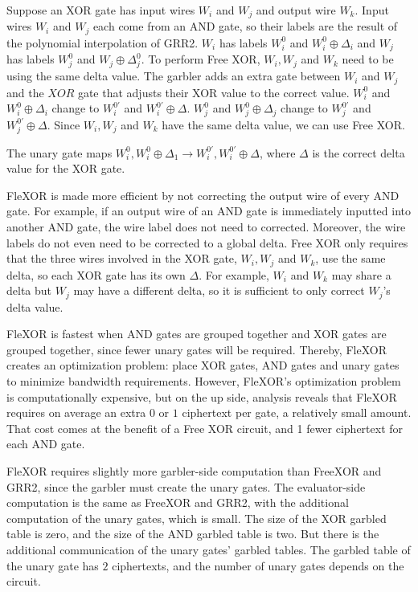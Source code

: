 Suppose an XOR gate has input wires $W_i$ and $W_j$ and output wire $W_k$.
Input wires $W_i$ and $W_j$ each come from an AND gate, so their labels are the result of the polynomial interpolation of GRR2.
$W_i$ has labels $W_i^0$ and $W_i^0 \oplus \Delta_i$ and $W_j$ has labels $W_j^0$ and $W_j \oplus \Delta_j^0$.
To perform Free XOR, $W_i,W_j$ and $W_k$ need to be using the same delta value. 
The garbler adds an extra gate between $W_i$ and $W_j$ and the $XOR$ gate that adjusts their XOR value to the correct value.
$W_i^0$ and $W_i^0 \oplus \Delta_i$ change to $W_i^{0'}$ and $W_i^{0'} \oplus \Delta$.
$W_j^0$ and $W_j^0 \oplus \Delta_j$ change to $W_j^{0'}$ and $W_j^{0'} \oplus \Delta$.
Since $W_i, W_j$ and $W_k$ have the same delta value, we can use Free XOR.

The unary gate maps $W_i^0,W_i^0 \oplus \Delta_1 \to W_i^{0'}, W_i^{0'} \oplus \Delta$, where $\Delta$ is the correct delta value for the XOR gate.

FleXOR is made more efficient by not correcting the output wire of every AND gate.
For example, if an output wire of an AND gate is immediately inputted into another AND gate, the wire label does not need to corrected.
Moreover, the wire labels do not even need to be corrected to a global delta.
Free XOR only requires that the three wires involved in the XOR gate, $W_i, W_j$ and $W_k$, use the same delta, so each XOR gate has its own $\Delta$.
For example, $W_i$ and $W_k$ may share a delta but $W_j$ may have a different delta, so it is sufficient to only correct $W_j$'s delta value.

FleXOR is fastest when AND gates are grouped together and XOR gates are grouped together, since fewer unary gates will be required.
Thereby, FleXOR creates an optimization problem: place XOR gates, AND gates and unary gates to minimize bandwidth requirements.
However, FleXOR's optimization problem is computationally expensive, but on the up side, analysis reveals that FleXOR requires on average an extra $0$ or $1$ ciphertext per gate, a relatively small amount.
That cost comes at the benefit of a Free XOR circuit, and 1 fewer ciphertext for each AND gate.

FleXOR requires slightly more garbler-side computation than FreeXOR and GRR2, since the garbler must create the unary gates.
The evaluator-side computation is the same as FreeXOR and GRR2, with the additional computation of the unary gates, which is small.
The size of the XOR garbled table is zero, and the size of the AND garbled table is two.
But there is the additional communication of the unary gates' garbled tables.
The garbled table of the unary gate has $2$ ciphertexts, and the number of unary gates depends on the circuit.

